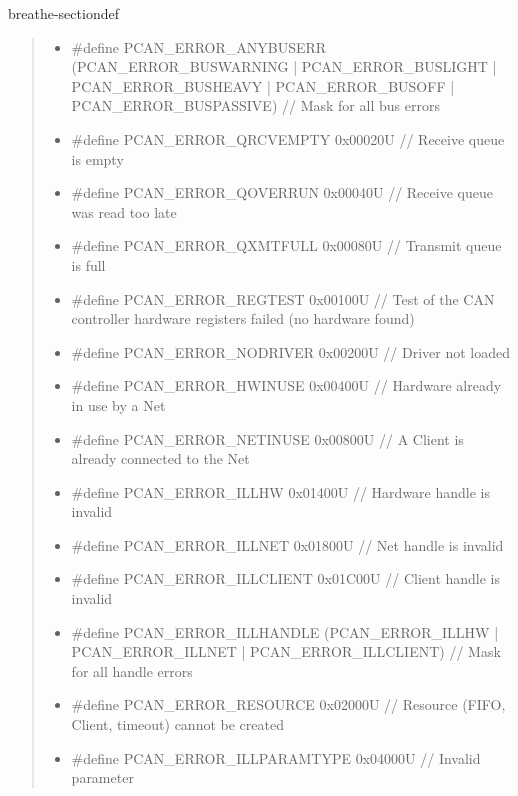 \documentclass[a4paper,10pt,english]{sphinxmanual}
\begin{document}
\begin{fulllineitems}
\begin{sphinxuseclass}{breathe-sectiondef}
\begin{fulllineitems}
\begin{quote}
\begin{description}
\begin{itemize}
\begin{itemize}
\item {} 
\sphinxAtStartPar
\#define PCAN\_ERROR\_ANYBUSERR (PCAN\_ERROR\_BUSWARNING | PCAN\_ERROR\_BUSLIGHT | PCAN\_ERROR\_BUSHEAVY | PCAN\_ERROR\_BUSOFF | PCAN\_ERROR\_BUSPASSIVE) // Mask for all bus errors

\item {} 
\sphinxAtStartPar
\#define PCAN\_ERROR\_QRCVEMPTY 0x00020U // Receive queue is empty

\item {} 
\sphinxAtStartPar
\#define PCAN\_ERROR\_QOVERRUN 0x00040U // Receive queue was read too late

\item {} 
\sphinxAtStartPar
\#define PCAN\_ERROR\_QXMTFULL 0x00080U // Transmit queue is full

\item {} 
\sphinxAtStartPar
\#define PCAN\_ERROR\_REGTEST 0x00100U // Test of the CAN controller hardware registers failed (no hardware found)

\item {} 
\sphinxAtStartPar
\#define PCAN\_ERROR\_NODRIVER 0x00200U // Driver not loaded

\item {} 
\sphinxAtStartPar
\#define PCAN\_ERROR\_HWINUSE 0x00400U // Hardware already in use by a Net

\item {} 
\sphinxAtStartPar
\#define PCAN\_ERROR\_NETINUSE 0x00800U // A Client is already connected to the Net

\item {} 
\sphinxAtStartPar
\#define PCAN\_ERROR\_ILLHW 0x01400U // Hardware handle is invalid

\item {} 
\sphinxAtStartPar
\#define PCAN\_ERROR\_ILLNET 0x01800U // Net handle is invalid

\item {} 
\sphinxAtStartPar
\#define PCAN\_ERROR\_ILLCLIENT 0x01C00U // Client handle is invalid

\item {} 
\sphinxAtStartPar
\#define PCAN\_ERROR\_ILLHANDLE (PCAN\_ERROR\_ILLHW | PCAN\_ERROR\_ILLNET | PCAN\_ERROR\_ILLCLIENT) // Mask for all handle errors

\item {} 
\sphinxAtStartPar
\#define PCAN\_ERROR\_RESOURCE 0x02000U // Resource (FIFO, Client, timeout) cannot be created

\item {} 
\sphinxAtStartPar
\#define PCAN\_ERROR\_ILLPARAMTYPE 0x04000U // Invalid parameter


\end{itemize}
\end{itemize}
\end{description}
\end{quote}
\end{fulllineitems}
\end{sphinxuseclass}
\end{fulllineitems}
\end{document}
